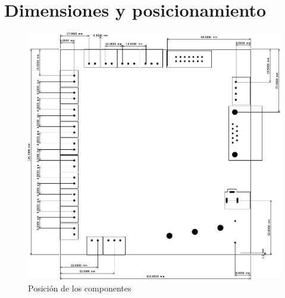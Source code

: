 \documentclass{reporti}
\begin{document}
\cover[width=1.35\textwidth][continue]

\section{Dimensiones y posicionamiento}
\begin{figure}[h]
  \centering
  \includegraphics[scale=1]{PCB_dimensiones.pdf}
  \caption{Posición de los componentes}
\end{figure}
\end{document}
